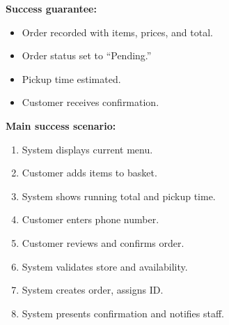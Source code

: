 \documentclass{article}
\begin{document}
\textbf{Success guarantee:}
\begin{itemize}
    \item Order recorded with items, prices, and total.
    \item Order status set to ``Pending.''
    \item Pickup time estimated.
    \item Customer receives confirmation.
\end{itemize}

\textbf{Main success scenario:}
\begin{enumerate}
    \item System displays current menu.
    \item Customer adds items to basket.
    \item System shows running total and pickup time.
    \item Customer enters phone number.
    \item Customer reviews and confirms order.
    \item System validates store and availability.
    \item System creates order, assigns ID.
    \item System presents confirmation and notifies staff.
\end{enumerate}
\end{document}
